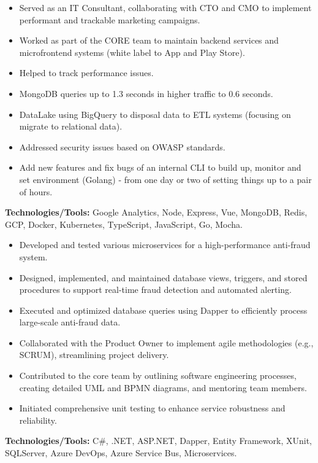 \documentclass[10pt,a4paper]{altacv}
\begin{document}
\begin{itemize}
    \setlength{\itemindent}{0.5em}
    \item[--] Served as an IT Consultant, collaborating with CTO and CMO to implement performant and trackable marketing campaigns.
    \item[--] Worked as part of the CORE team to maintain backend services and microfrontend systems (white label to App and Play Store).
    \item[--] Helped to track performance issues.
    \item[--] MongoDB queries up to 1.3 seconds in higher traffic to 0.6 seconds.
    \item[--] DataLake using BigQuery to disposal data to ETL systems (focusing on migrate to relational data).
   
   \break
{}


    \item[--] Addressed security issues based on OWASP standards.
    \item[--] Add new features and fix bugs of an internal CLI to build up, monitor and set environment (Golang) - from one day or two of setting things up to a pair of hours.
\end{itemize}
\textbf{Technologies/Tools:} Google Analytics, Node, Express, Vue, MongoDB, Redis, GCP, Docker, Kubernetes, TypeScript, JavaScript, Go, Mocha.
\vspace{5mm}


\begin{itemize}
    \setlength{\itemindent}{0.5em}
    \item[--] Developed and tested various microservices for a high-performance anti-fraud system.
    \item[--] Designed, implemented, and maintained database views, triggers, and stored procedures to support real-time fraud detection and automated alerting.
    \item[--] Executed and optimized database queries using Dapper to efficiently process large-scale anti-fraud data.
    \item[--] Collaborated with the Product Owner to implement agile methodologies (e.g., SCRUM), streamlining project delivery.
    \item[--] Contributed to the core team by outlining software engineering processes, creating detailed UML and BPMN diagrams, and mentoring team members.
    \item[--] Initiated comprehensive unit testing to enhance service robustness and reliability.
\end{itemize}
\textbf{Technologies/Tools:} C\#, .NET, ASP.NET, Dapper, Entity Framework, XUnit, SQLServer, Azure DevOps, Azure Service Bus, Microservices.
\vspace{5mm}
\end{document}
